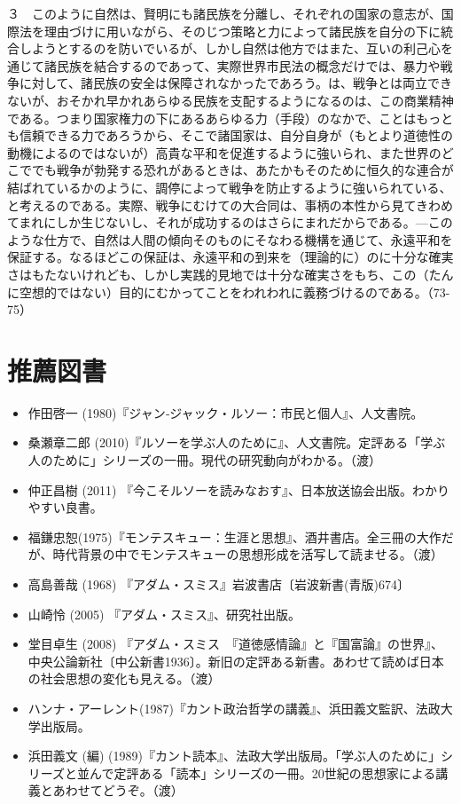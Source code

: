 ３　このように自然は、賢明にも諸民族を分離し、それぞれの国家の意志が、国際法を理由づけに用いながら、そのじつ策略と力によって諸民族を自分の下に統合しようとするのを防いでいるが、しかし自然は他方ではまた、互いの利己心を通じて諸民族を結合するのであって、実際世界市民法の概念だけでは、暴力や戦争に対して、諸民族の安全は保障されなかったであろう。は、戦争とは両立できないが、おそかれ早かれあらゆる民族を支配するようになるのは、この商業精神である。つまり国家権力の下にあるあらゆる力（手段）のなかで、ことはもっとも信頼できる力であろうから、そこで諸国家は、自分自身が（もとより道徳性の動機によるのではないが）高貴な平和を促進するように強いられ、また世界のどこででも戦争が勃発する恐れがあるときは、あたかもそのために恒久的な連合が結ばれているかのように、調停によって戦争を防止するように強いられている、と考えるのである。実際、戦争にむけての大合同は、事柄の本性から見てきわめてまれにしか生じないし、それが成功するのはさらにまれだからである。{\——}このような仕方で、自然は人間の傾向そのものにそなわる機構を通じて、永遠平和を保証する。なるほどこの保証は、永遠平和の到来を（理論的に）のに十分な確実さはもたないけれども、しかし実践的見地では十分な確実さをもち、この（たんに空想的ではない）目的にむかってことをわれわれに義務づけるのである。（73-75）







\section{推薦図書}

\begin{itemize}
\item 作田啓一 (1980)『ジャン‐ジャック・ルソー：市民と個人』、人文書院。
\item 桑瀬章二郎 (2010)『ルソーを学ぶ人のために』、人文書院。定評ある「学ぶ人のために」シリーズの一冊。現代の研究動向がわかる。（渡）
\item 仲正昌樹 (2011) 『今こそルソーを読みなおす』、日本放送協会出版。わかりやすい良書。
\item 福鎌忠恕(1975)『モンテスキュー：生涯と思想』、酒井書店。全三冊の大作だが、時代背景の中でモンテスキューの思想形成を活写して読ませる。（渡）
\item 高島善哉 (1968) 『アダム・スミス』岩波書店〔岩波新書(青版)674〕
\item 山崎怜 (2005) 『アダム・スミス』、研究社出版。
\item 堂目卓生 (2008) 『アダム・スミス　『道徳感情論』と『国富論』の世界』、中央公論新社〔中公新書1936〕。新旧の定評ある新書。あわせて読めば日本の社会思想の変化も見える。（渡）
\item 
ハンナ・アーレント(1987)『カント政治哲学の講義』、浜田義文監訳、法政大学出版局。
\item 浜田義文 (編) (1989)『カント読本』、法政大学出版局。「学ぶ人のために」シリーズと並んで定評ある「読本」シリーズの一冊。20世紀の思想家による講義とあわせてどうぞ。（渡）
\end{itemize}


